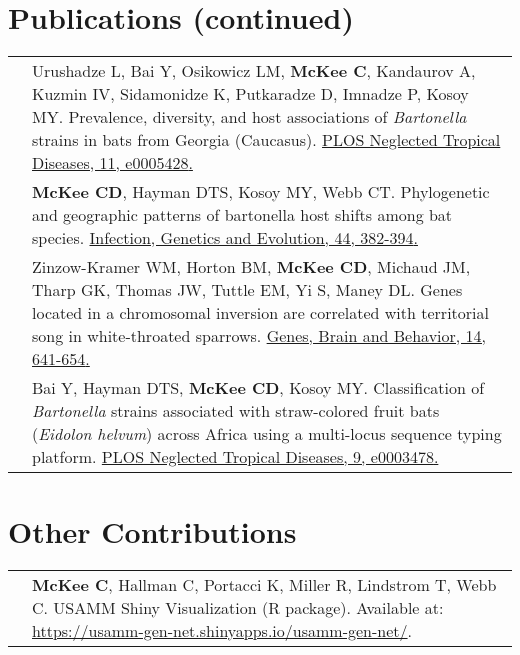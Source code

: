\documentclass[letterpaper]{deedy-resume} %
\begin{document}
\section{Publications (continued)}
\begin{tabular}{>{\raggedright\arraybackslash}p{2cm}p{16cm}}

2017 & Urushadze L, Bai Y, Osikowicz LM, \textbf{McKee C}, Kandaurov A, Kuzmin IV, Sidamonidze K, Putkaradze D, Imnadze P, Kosoy MY. Prevalence, diversity, and host associations of \textit{Bartonella} strains in bats from Georgia (Caucasus). \href{https://doi.org/10.1371/journal.pntd.0005428}{\textcolor{special}{PLOS Neglected Tropical Diseases, 11, e0005428}.}\\

2016 & \textbf{McKee CD}, Hayman DTS, Kosoy MY, Webb CT. Phylogenetic and geographic patterns of bartonella host shifts among bat species. \href{https://doi.org/10.1016/j.meegid.2016.07.033}{\textcolor{special}{Infection, Genetics and Evolution, 44, 382-394}.}\\

2015 & Zinzow-Kramer WM, Horton BM, \textbf{McKee CD}, Michaud JM, Tharp GK, Thomas JW, Tuttle EM, Yi S, Maney DL. Genes located in a chromosomal inversion are correlated with territorial song in white-throated sparrows. \href{http://doi.wiley.com/10.1111/gbb.12252}{\textcolor{special}{Genes, Brain and Behavior, 14, 641-654}.}\\

2015 & Bai Y, Hayman DTS, \textbf{McKee CD}, Kosoy MY. Classification of \textit{Bartonella} strains associated with straw-colored fruit bats (\textit{Eidolon helvum}) across Africa using a multi-locus sequence typing platform. \href{https://doi.org/10.1371/journal.pntd.0003478}{\textcolor{special}{PLOS Neglected Tropical Diseases, 9, e0003478}.}\\

\end{tabular}
\sectionspace


\section{Other Contributions}
\begin{tabular}{>{\raggedright\arraybackslash}p{2cm}p{16cm}}
2015 & \textbf{McKee C}, Hallman C, Portacci K, Miller R, Lindstrom T, Webb C. USAMM Shiny Visualization (R package). Available at: \href{https://usamm-gen-net.shinyapps.io/usamm-gen-net/}{\textcolor{special}{https://usamm-gen-net.shinyapps.io/usamm-gen-net/}}.
\end{tabular}
\sectionspace
\end{document}

